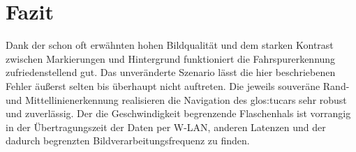 





\section{Fazit}
Dank der schon oft erwähnten hohen Bildqualität und dem starken Kontrast zwischen Markierungen und Hintergrund funktioniert die Fahrspurerkennung zufriedenstellend gut. Das unveränderte Szenario lässt die hier beschriebenen Fehler äußerst selten bis überhaupt nicht auftreten. Die jeweils souveräne Rand-und Mittellinienerkennung realisieren die Navigation des \gls{glos:tucar}s sehr robust und zuverlässig. Der die Geschwindigkeit begrenzende Flaschenhals ist vorrangig in der Übertragungszeit der Daten per W-LAN, anderen Latenzen und der dadurch begrenzten Bildverarbeitungsfrequenz zu finden. 

